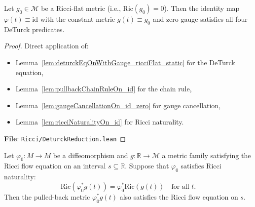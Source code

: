 \begin{lemma}
\label{lem:id_satisfies_all_predicates}
\leanok
Let $g_0 \in \mathcal{M}$ be a Ricci-flat metric (i.e., $\mathrm{Ric}(g_0) = 0$). Then the identity map $\varphi(t) \equiv \mathrm{id}$ with the constant metric $g(t) \equiv g_0$ and zero gauge satisfies all four DeTurck predicates.
\end{lemma}

\begin{proof}
\leanok
{}
Direct application of:
\begin{itemize}
\item Lemma~\ref{lem:deturckEqOnWithGauge_ricciFlat_static} for the DeTurck equation,
\item Lemma~\ref{lem:pullbackChainRuleOn_id} for the chain rule,
\item Lemma~\ref{lem:gaugeCancellationOn_id_zero} for gauge cancellation,
\item Lemma~\ref{lem:ricciNaturalityOn_id} for Ricci naturality.
\end{itemize}

\textbf{File}: \texttt{Ricci/DeturckReduction.lean}
\end{proof}

\begin{theorem}
\label{thm:const_diff_reduction}
\leanok
Let $\varphi_0 : M \to M$ be a diffeomorphism and $g : \mathbb{R} \to \mathcal{M}$ a metric family satisfying the Ricci flow equation on an interval $s \subseteq \mathbb{R}$. Suppose that $\varphi_0$ satisfies Ricci naturality:
\[
\mathrm{Ric}(\varphi_0^* g(t)) = \varphi_0^* \mathrm{Ric}(g(t)) \quad \text{for all } t.
\]
Then the pulled-back metric $\varphi_0^* g(t)$ also satisfies the Ricci flow equation on $s$.
\end{theorem}

